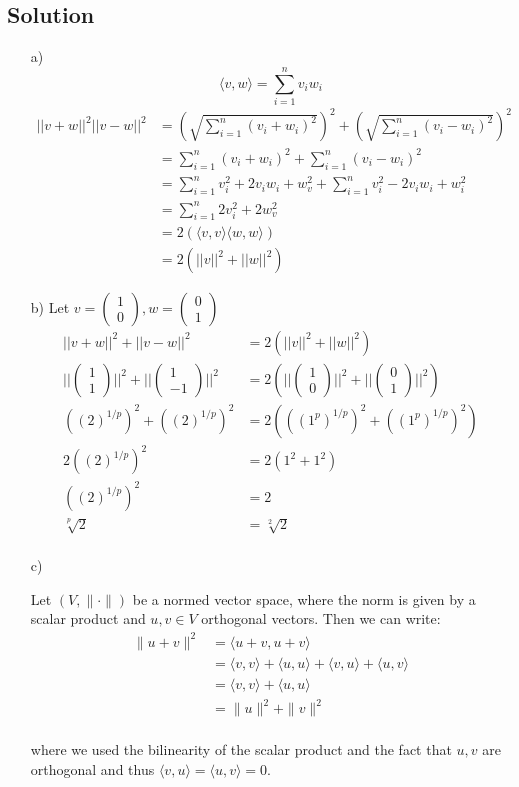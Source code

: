 \documentclass[10pt]{article}
\numberwithin{equation}{section}
\newcommand{\unita}{\begin{pmatrix} 1\\0\end{pmatrix}}
\newcommand{\unitb}{\begin{pmatrix} 0\\1\end{pmatrix}}
\begin{document}
\subsection*{Solution}
\begin{enumerate}
\item[a)]{
$$\langle v, w \rangle = \sum_{i=1}^n v_i w_i$$
    \begin{align*}
      ||v + w||^2 ||v - w||^2 &= \left(\sqrt{\sum_{i=1}^n (v_i + w_i)^2}\right)^2 + \left(\sqrt{\sum_{i=1}^n (v_i - w_i)^2}\right)^2\\
      &= \sum_{i=1}^n (v_i + w_i)^2+ \sum_{i=1}^n (v_i - w_i)^2\\
      &= \sum_{i=1}^n v_i^2 +2v_i w_i + w_v^2 + \sum_{i=1}^n v_i^2 -2v_i w_i  + w_i^2\\
      &= \sum_{i=1}^n 2v_i^2 + 2w_v^2 \\
      &= 2 (\langle v,v \rangle \langle w,w \rangle)\\
      &= 2 (||v||^2 + ||w||^2)
    \end{align*}
  }
\item[b)]{
    Let $v = \unita, w = \unitb$
    \begin{align*}
      || v+w||^2  + || v-w||^2 &= 2(||v||^2 +||w||^2)\\
      || \begin{pmatrix}1\\1\end{pmatrix}||^2  + || \begin{pmatrix}1\\-1\end{pmatrix}||^2 &= 2\left(||\unita||^2 +||\unitb||^2\right)\\
      ((2)^{1/p})^2 + ((2)^{1/p})^2 &= 2\left( ((1^p)^{1/p})^2 + ((1^p)^{1/p})^2\right)\\
      2((2)^{1/p})^2 &= 2( 1^2 + 1^2)\\
      ((2)^{1/p})^2 &= 2\\
      \sqrt[p]{2} &= \sqrt[2]{2}\\
    \end{align*}
  }
\item[c)]{
Let $(V,\|\cdot\|)$ be a normed vector space, where the norm is given by a scalar product and $u, v \in V$ orthogonal vectors. Then we can write:
\begin{align*}
  \|u+v\|^2 &= \langle u+v, u+v\rangle\\
            &= \langle v, v\rangle + \langle u, u\rangle + \langle v, u\rangle + \langle u, v\rangle\\
            &=  \langle v, v\rangle + \langle u, u\rangle\\ 
            &= \|u\|^2+\|v\|^2\\
\end{align*}

where we used the bilinearity of the scalar product and the fact that $u, v$ are orthogonal and thus $ \langle v, u\rangle = \langle u, v\rangle=0.$
}
\end{enumerate}
\end{document}
